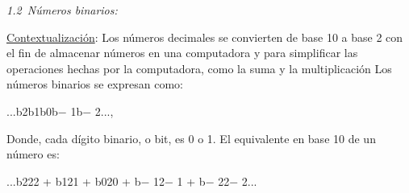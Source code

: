 \documentclass[12pt]{article}
\renewcommand{\_}{\kern-1.5pt\textunderscore\kern-1.5pt}
\begin{document}
\vspace{\baselineskip}
\setlength{\parskip}{8.04pt}
\setlength{\parskip}{0.0pt}
\begin{adjustwidth}{0.5in}{0.0in}
\begin{justify}
{\fontsize{10pt}{12.0pt}\selectfont \textit{1.2\  Números binarios:}\par}
\end{justify}\par

\end{adjustwidth}


\vspace{\baselineskip}
\setlength{\parskip}{8.04pt}
\setlength{\parskip}{0.0pt}
\begin{adjustwidth}{0.5in}{0.0in}
\begin{justify}
{\fontsize{10pt}{12.0pt}\selectfont \uline{Contextualización}: Los números decimales se convierten de base 10 a base 2 con el ﬁn de almacenar números en una computadora y para simpliﬁcar las operaciones hechas por la computadora, como la suma y la multiplicación Los números binarios se expresan como:\par}
\end{justify}\par

\end{adjustwidth}

\begin{adjustwidth}{0.5in}{0.0in}
\begin{Center}
{\fontsize{10pt}{12.0pt}\selectfont ...b2b1b0b$-$ 1b$-$ 2...,\par}
\end{Center}\par

\end{adjustwidth}

\begin{adjustwidth}{0.5in}{0.0in}
\begin{justify}
{\fontsize{10pt}{12.0pt}\selectfont Donde, cada dígito binario, o bit, es 0 o 1. El equivalente en base 10 de un número es:\par}
\end{justify}\par

\end{adjustwidth}

\begin{adjustwidth}{0.5in}{0.0in}
\begin{Center}
{\fontsize{10pt}{12.0pt}\selectfont ...b222 + b121 + b020 + b$-$ 12$-$ 1 + b$-$ 22$-$ 2...\par}
\end{Center}\par

\end{adjustwidth}
\end{document}
